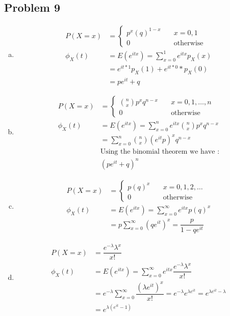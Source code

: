 \documentclass{article}
\begin{document}
\begin{flushleft}
\section*{Problem 9}
\begin{enumerate}[(a)]
\item
\begin{align*}
P(X=x)&=\begin{cases}
p^x(q)^{1-x} &\quad x=0,1\\
0 &\quad \text{otherwise}
\end{cases}\\
\phi_X(t)&=E(e^{itx})=\sum_{x=0}^{1} e^{itx}p_X(x)\\
&=e^{it*1}p_X(1)+e^{it*0}*p_X(0)\\
&=pe^{it}+q
\end{align*}
\item 
\begin{align*}
P(X=x)&=\begin{cases}
{n \choose x}p^xq^{n-x}& \quad x=0,1,\dots,n\\
0 & \quad \text{otherwise} 
\end{cases}\\
\phi_X(t)&=E(e^{itx})=\sum_{x=0}^{n}e^{itx}{n \choose x}p^xq^{n-x}\\
&=\sum_{x=0}^{n}{n \choose x}(e^{it}p)^x q^{n-x}\\
&\text{Using the binomial theorem we have :}\\
&(pe^{it}+q)^n
\end{align*}
\item
\begin{align*}
P(X=x)&=\begin{cases}
p(q)^{x} &\quad x=0,1,2,\dots\\
0 &\quad \text{otherwise}
\end{cases}\\
\phi_X(t)&=E(e^{itx})=\sum_{x=0}^{\infty}e^{itx}p(q)^{x}\\
&=p\sum_{x=0}^{\infty}(qe^{it})^x=\dfrac{p}{1-qe^{it}}
\end{align*}
\item
\begin{align*}
P(X=x)&=\dfrac{e^{-\lambda} \lambda^{x}}{x!}\\
\phi_X(t)&=E(e^{itx})=\sum_{x=0}^{\infty}e^{itx}\dfrac{e^{-\lambda} \lambda^{x}}{x!}\\
&=e^{-\lambda}\sum_{x=0}^{\infty}\dfrac{(\lambda e^{it})^x}{x!}=e^{-\lambda}e^{\lambda e^{it}}=e^{\lambda e^{it}-\lambda}\\
&=e^{\lambda (e^{it}-1)}
\end{align*}
\end{enumerate}
\end{flushleft}
\end{document}
